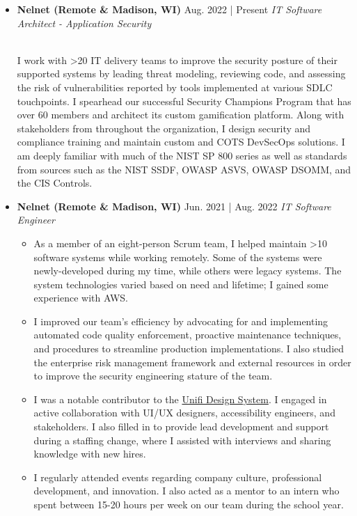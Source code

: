 \documentclass[11pt]{article}
\newcommand{\job}[3]{\vspace{1.5mm}
  \textbf{#1} \hfill #2 \linebreak \textit{#3}
}
\begin{document}
\begin{itemize}[leftmargin=*]
	\item[]
	      \job
	      {Nelnet (Remote \& Madison, WI)}
	      {Aug. 2022 | Present}
	      {IT Software Architect - Application Security}
               {\\I work with >20 IT delivery teams to improve the security posture of their supported systems by leading threat modeling, reviewing code, and assessing the risk of vulnerabilities reported by tools implemented at various SDLC touchpoints. I spearhead our successful Security Champions Program that has over 60 members and architect its custom gamification platform. Along with stakeholders from throughout the organization, I design security and compliance training and maintain custom and COTS DevSecOps solutions. I am deeply familiar with much of the NIST SP 800 series as well as standards from sources such as the NIST SSDF, OWASP ASVS, OWASP DSOMM, and the CIS Controls.}
	\item[]
	      \job
	      {Nelnet (Remote \& Madison, WI)}
	      {Jun. 2021 | Aug. 2022}
	      {IT Software Engineer}
	      \begin{itemize}
	      	\item As a member of an eight-person Scrum team, I helped maintain >10 software systems while working remotely. Some of the systems were newly-developed during my time, while others were legacy systems. The system technologies varied based on need and lifetime; I gained some experience with AWS.
                     \item I improved our team's efficiency by advocating for and implementing automated code quality enforcement, proactive maintenance techniques, and procedures to streamline production implementations. I also studied the enterprise risk management framework and external resources in order to improve the security engineering stature of the team.
                     \item I was a notable contributor to the \href{https://unifi.nelnet.io/}{Unifi Design System}. I engaged in active collaboration with UI/UX designers, accessibility engineers, and stakeholders. I also filled in to provide lead development and support during a staffing change, where I assisted with interviews and sharing knowledge with new hires.
                     \item I regularly attended events regarding company culture, professional development, and innovation. I also acted as a mentor to an intern who spent between 15-20 hours per week on our team during the school year.

\end{itemize}
\end{itemize}
\end{document}
